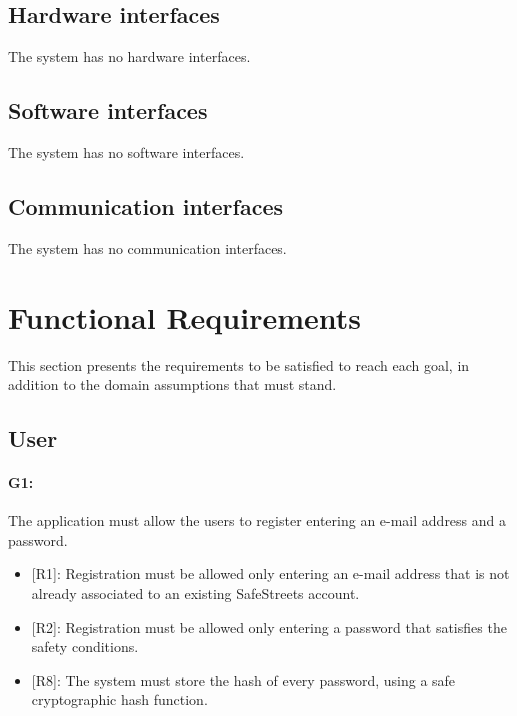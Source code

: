 \documentclass[12pt,a4paper]{report}
\begin{document}
		\subsection{Hardware interfaces}
			The system has no hardware interfaces.
		\subsection{Software interfaces}
			The system has no software interfaces.
		\subsection{Communication interfaces}
			The system has no communication interfaces.
	\section{Functional Requirements}
		This section presents the requirements to be satisfied to reach each goal, in addition to the domain assumptions that must stand.
		\subsection{User} 

			\paragraph {G1:} The application must allow the users to register entering an e-mail address and a password.
			\begin{itemize}
				\item{[R1]:} Registration must be allowed only entering an e-mail address that is not already associated to an existing SafeStreets account.
				\item{[R2]:} Registration must be allowed only entering a password that satisfies the safety conditions.
				\item{[R8]:} The system must store the hash of every password, using a safe cryptographic hash function.
			\end{itemize}
\end{document}
